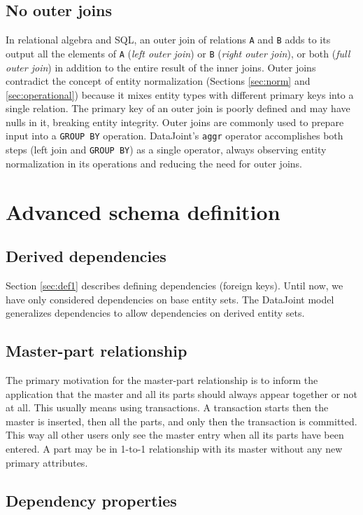 \documentclass[letter,10pt]{article}
\newcommand{\datajoint}{DataJoint\xspace}
\begin{document}
\subsection{No outer joins}
In relational algebra and SQL, an outer join of relations \lstinline$A$ and \lstinline$B$ adds to its output all the elements of \lstinline$A$ (\emph{left outer join}) or  \lstinline$B$ (\emph{right outer join}), or both (\emph{full outer join}) in addition to the entire result of the inner joins. 
Outer joins contradict the concept of entity normalization (Sections \ref{sec:norm} and \ref{sec:operational}) because it mixes entity types with different primary keys into a single relation.
The primary key of an outer join is poorly defined and may have nulls in it, breaking entity integrity.
Outer joins are commonly used to prepare input into a \lstinline$GROUP BY$ operation.
\datajoint's \lstinline$aggr$ operator accomplishes both steps (left join and \lstinline$GROUP BY$) as a single operator, always observing entity normalization in its operations and reducing the need for outer joins.


\section{Advanced schema definition}\label{sec:def2}
\subsection{Derived dependencies}\label{sec:dep}
Section \ref{sec:def1} describes defining dependencies (foreign keys).
Until now, we have only considered dependencies on base entity sets. 
The \datajoint model generalizes dependencies to allow dependencies on derived entity sets.

\subsection{Master-part relationship}
The primary motivation for the master-part relationship is to inform the application that the master and all its parts should always appear together or not at all.  
This usually means using transactions.  
A transaction starts then the master is inserted, then all the parts, and only then the transaction is committed.  
This way all other users only see the master entry when all its parts have been entered.
A part may be in 1-to-1 relationship with its master without any new primary attributes.

\subsection{Dependency properties}
\end{document}

